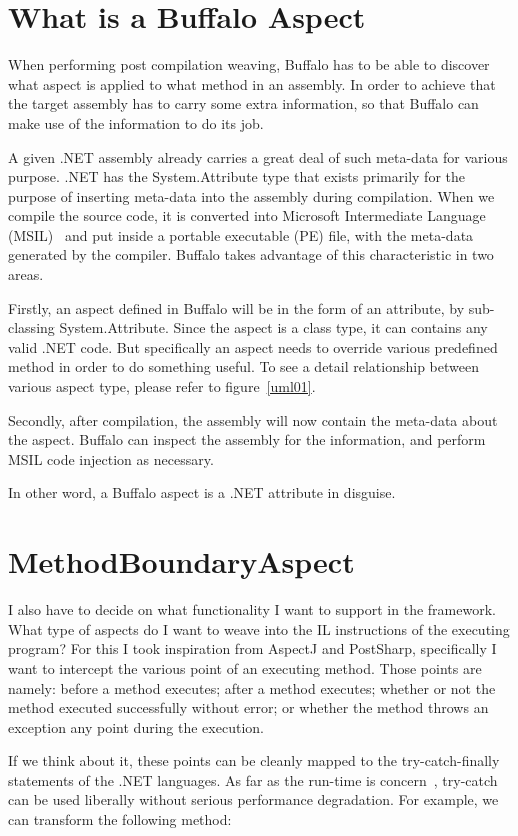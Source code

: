 \section{What is a Buffalo Aspect}

When performing post compilation weaving, Buffalo has to be able to discover what aspect is applied to what method in an assembly. In order to achieve that the target assembly has to carry some extra information, so that Buffalo can make use of the information to do its job.

A given .NET assembly already carries a great deal of such meta-data for various purpose. .NET has the System.Attribute type that exists primarily for the purpose of inserting meta-data into the assembly during compilation. When we compile the source code, it is converted into Microsoft Intermediate Language (MSIL)~\cite{msil_text} and put inside a portable executable (PE) file, with the meta-data generated by the compiler. Buffalo takes advantage of this characteristic in two areas.

Firstly, an aspect defined in Buffalo will be in the form of an attribute, by sub-classing System.Attribute. Since the aspect is a class type, it can contains any valid .NET code. But specifically an aspect needs to override various predefined method in order to do something useful. To see a detail relationship between various aspect type, please refer to figure~\ref{uml01}.

Secondly, after compilation, the assembly will now contain the meta-data about the aspect. Buffalo can inspect the assembly for the information, and perform MSIL code injection as necessary.

In other word, a Buffalo aspect is a .NET attribute in disguise.

\section{MethodBoundaryAspect}
I also have to decide on what functionality I want to support in the framework. What type of aspects do I want to weave into the IL instructions of the executing program? For this I took inspiration from AspectJ and PostSharp, specifically I want to intercept the various point of an executing method. Those points are namely: before a method executes; after a method executes; whether or not the method executed successfully without error; or whether the method throws an exception any point during the execution.

If we think about it, these points can be cleanly mapped to the try-catch-finally statements of the .NET languages. As far as the run-time is concern~\cite{ecma334, ecma335}, try-catch can be used liberally without serious performance degradation. For example, we can transform the following method:

